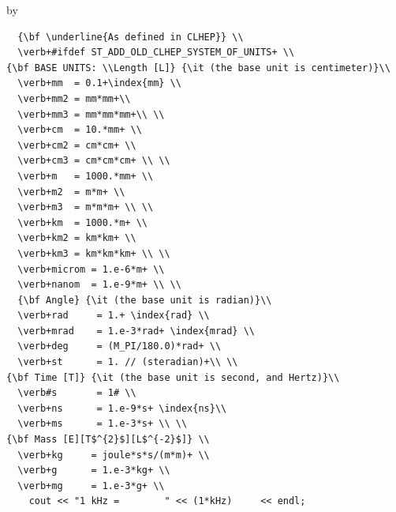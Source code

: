 \documentclass[twoside]{article}
\newcommand{\entrylabel}[1]{\mbox{\textbf{{#1}}}\hfil}%
\newenvironment{entry}
{\begin{list}{}%
    {\renewcommand{\makelabel}{\entrylabel}%
     \setlength{\labelwidth}{90pt}%
     \setlength{\leftmargin}{\labelwidth}
     \advance\leftmargin by \labelsep%
      }%
    }%
  {\end{list}}
\newcommand{\Entrylabel}[1]%
{\raisebox{0pt}[1ex][0pt]{\makebox[\labelwidth][l]%
    {\parbox[t]{\labelwidth}{\hspace{0pt}\textbf{{#1}}}}}}
\newenvironment{Entry}%
{\renewcommand{\entrylabel}{\Entrylabel}\begin{entry}}%
  {\end{entry}}
\begin{document}
\begin{description}
\begin{Entry}
\begin{verbatim}
  {\bf \underline{As defined in CLHEP}} \\
  \verb+#ifdef ST_ADD_OLD_CLHEP_SYSTEM_OF_UNITS+ \\  
{\bf BASE UNITS: \\Length [L]} {\it (the base unit is centimeter)}\\
  \verb+mm  = 0.1+\index{mm} \\  
  \verb+mm2 = mm*mm+\\
  \verb+mm3 = mm*mm*mm+\\ \\
  \verb+cm  = 10.*mm+ \\
  \verb+cm2 = cm*cm+ \\
  \verb+cm3 = cm*cm*cm+ \\ \\
  \verb+m   = 1000.*mm+ \\  
  \verb+m2  = m*m+ \\
  \verb+m3  = m*m*m+ \\ \\
  \verb+km  = 1000.*m+ \\
  \verb+km2 = km*km+ \\
  \verb+km3 = km*km*km+ \\ \\
  \verb+microm = 1.e-6*m+ \\
  \verb+nanom  = 1.e-9*m+ \\ \\
  {\bf Angle} {\it (the base unit is radian)}\\
  \verb+rad     = 1.+ \index{rad} \\ 
  \verb+mrad    = 1.e-3*rad+ \index{mrad} \\ 
  \verb+deg     = (M_PI/180.0)*rad+ \\
  \verb+st      = 1. // (steradian)+\\ \\
{\bf Time [T]} {\it (the base unit is second, and Hertz)}\\
  \verb#s       = 1# \\
  \verb+ns      = 1.e-9*s+ \index{ns}\\ 
  \verb+ms      = 1.e-3*s+ \\ \\ 
{\bf Mass [E][T$^{2}$][L$^{-2}$]} \\
  \verb+kg     = joule*s*s/(m*m)+ \\
  \verb+g      = 1.e-3*kg+ \\
  \verb+mg     = 1.e-3*g+ \\
    cout << "1 kHz =        " << (1*kHz)     << endl;


\end{verbatim}
\end{Entry}
\end{description}
\end{document}
